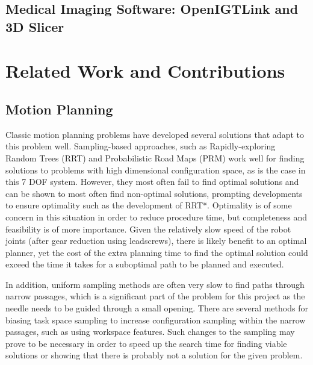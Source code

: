 \documentclass[12pt]{report}
\begin{document}
\section{Medical Imaging Software: OpenIGTLink and 3D Slicer}


\chapter{Related Work and Contributions}
\section{Motion Planning}
\label{sec:relatedWork}
Classic motion planning problems have developed several solutions that adapt to this problem well. Sampling-based approaches, such as Rapidly-exploring Random Trees (RRT) and Probabilistic Road Maps (PRM) work well for finding solutions to problems with high dimensional configuration space, as is the case in this 7 DOF system. \cite{planningAlgorithms} However, they most often fail to find optimal solutions and can be shown to most often find non-optimal solutions, prompting developments to ensure optimality such as the development of RRT*. \cite{rrtStar} Optimality is of some concern in this situation in order to reduce procedure time, but completeness and feasibility is of more importance. Given the relatively slow speed of the robot joints (after gear reduction using leadscrews), there is likely benefit to an optimal planner, yet the cost of the extra planning time to find the optimal solution could exceed the time it takes for a suboptimal path to be planned and executed.

In addition, uniform sampling methods are often very slow to find paths through narrow passages, which is a significant part of the problem for this project as the needle needs to be guided through a small opening. There are several methods for biasing task space sampling to increase configuration sampling within the narrow passages, such as using workspace features. \cite{workspaceBiasing} Such changes to the sampling may prove to be necessary in order to speed up the search time for finding viable solutions or showing that there is probably not a solution for the given problem. 
\end{document}
